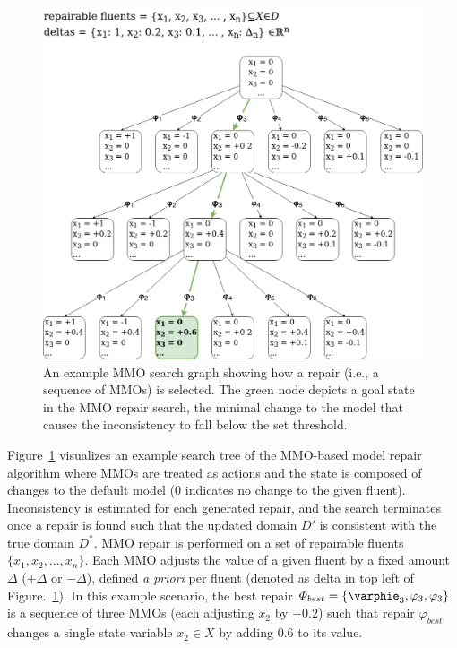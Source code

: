 \documentclass[letterpaper]{article} %
\begin{document}
\begin{figure}
	\centering
	\includegraphics[width=\columnwidth]{figures/MMO_search_tree3.png}
	\caption{An example MMO search graph showing how a repair (i.e., a sequence of MMOs) is selected. The green node depicts a goal state in the MMO repair search, the minimal change to the model that causes the inconsistency to fall below the set threshold.}
	\label{fig:mmo_search}
\end{figure}

Figure~\ref{fig:mmo_search} visualizes an example search tree of the MMO-based model repair algorithm where MMOs are treated as actions and the state is composed of changes to the default model (0 indicates no change to the given fluent). Inconsistency is estimated for each generated repair, and the search terminates once a repair is found such that the updated domain $D'$ is consistent with the true domain $D^*$. MMO repair is performed on a set of repairable fluents $\{x_1, x_2, ..., x_n\}$. Each MMO adjusts the value of a given fluent by a fixed amount $\Delta$ ($+\Delta$ or $-\Delta$), defined \emph{a priori} per fluent (denoted as delta in top left of Figure.~\ref{fig:mmo_search}). In this example scenario, the best repair $\varPhi_{best} = \{\varphie_3, \varphi_3, \varphi_3\}$ is a sequence of three MMOs (each adjusting $x_2$ by $+0.2$) such that repair $\varphi_{best}$ changes a single state variable $x_2 \in X$ by adding $0.6$ to its value.
\end{document}
